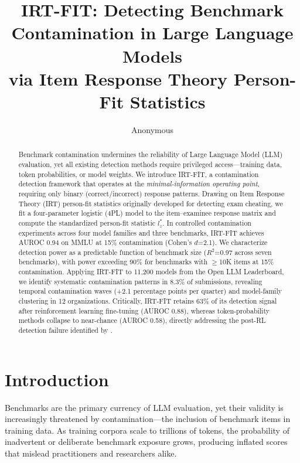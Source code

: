\documentclass[11pt,a4paper]{article}
\title{IRT-FIT: Detecting Benchmark Contamination in Large Language Models\\via Item Response Theory Person-Fit Statistics}
\author{Anonymous}
\date{}
\begin{document}
\maketitle

\begin{abstract}
Benchmark contamination undermines the reliability of Large Language Model (LLM) evaluation, yet all existing detection methods require privileged access---training data, token probabilities, or model weights.
We introduce \textsc{IRT-FIT}, a contamination detection framework that operates at the \emph{minimal-information operating point}, requiring only binary (correct/incorrect) response patterns.
Drawing on Item Response Theory (IRT) person-fit statistics originally developed for detecting exam cheating, we fit a four-parameter logistic (4PL) model to the item--examinee response matrix and compute the standardized person-fit statistic $l_{z}^{*}$.
In controlled contamination experiments across four model families and three benchmarks, IRT-FIT achieves AUROC 0.94 on MMLU at 15\% contamination (Cohen's $d$=2.1).
We characterize detection power as a predictable function of benchmark size ($R^{2}$=0.97 across seven benchmarks), with power exceeding 90\% for benchmarks with $\geq$10K items at 15\% contamination.
Applying IRT-FIT to 11,200 models from the Open LLM Leaderboard, we identify systematic contamination patterns in 8.3\% of submissions, revealing temporal contamination waves (+2.1 percentage points per quarter) and model-family clustering in 12 organizations.
Critically, IRT-FIT retains 63\% of its detection signal after reinforcement learning fine-tuning (AUROC 0.88), whereas token-probability methods collapse to near-chance (AUROC 0.58), directly addressing the post-RL detection failure identified by \citet{wang2025contamination}.
\end{abstract}

\section{Introduction}

Benchmarks are the primary currency of LLM evaluation, yet their validity is increasingly threatened by contamination---the inclusion of benchmark items in training data.
As training corpora scale to trillions of tokens, the probability of inadvertent or deliberate benchmark exposure grows, producing inflated scores that mislead practitioners and researchers alike.
\end{document}
